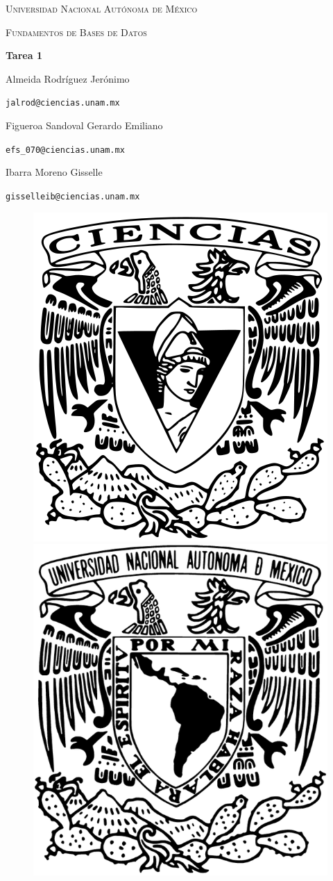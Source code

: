 \documentclass[a4paper, 12pt]{report}
\begin{document}
\begin{titlepage}
    \centering
    {\scshape\Huge Universidad Nacional Autónoma de México \par}
    \vspace{1.25cm}
    {\scshape\huge Fundamentos de Bases de Datos\par}
    \vspace{1.25cm}
    {\huge\bfseries Tarea 1\par}
    \vspace{1.25cm}
    {\Large\textsc Almeida Rodríguez Jerónimo\par}
    \vspace{.1cm}
    {\large\texttt{jalrod@ciencias.unam.mx}\par}
    \vspace{0.25cm}
    {\Large\textsc Figueroa Sandoval Gerardo Emiliano\par}
    \vspace{.1cm}
    {\large\texttt{efs\_070@ciencias.unam.mx}\par}
    \vspace{0.25cm}
    {\Large\textsc Ibarra Moreno Gisselle \par}
    \vspace{.1cm}
    {\large\texttt{gisselleib@ciencias.unam.mx}\par}
    \vspace{1.5cm}
    \vfill
    \begin{figure}[hb!]
        \includegraphics[width=.3\textwidth]
            {../logos/escudo_f-ciencias.png}\hfill
        \includegraphics[width=.3\textwidth]
            {../logos/Escudo_UNAM.png}\hfill
    \end{figure}
\end{titlepage}
\end{document}
